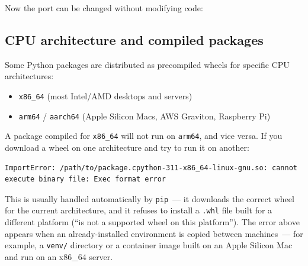 \noindent{}Now the port can be changed without modifying code:

\begin{codebox}[short]

\begin{Shaded}
\begin{Highlighting}[]
\OperatorTok{=}
\end{Highlighting}
\end{Shaded}

\end{codebox}

\subsection*{CPU architecture and compiled packages}\label{08-hidden-dependencies:cpu-architecture-and-compiled-packages}

Some Python packages are distributed as precompiled wheels for specific CPU architectures:

\begin{itemize}
\tightlist
\item
  \texttt{x86\_64} (most Intel/AMD desktops and servers)
\item
  \texttt{arm64} / \texttt{aarch64} (Apple Silicon Macs, AWS Graviton, Raspberry Pi)
\end{itemize}

\noindent{}A package compiled for \texttt{x86\_64} will not run on \texttt{arm64}, and vice versa. If you download a wheel on one architecture and try to run it on another:

\begin{outputbox}[short]
\begin{Verbatim}[fontsize=\codesize, breaklines, breakanywhere, breaksymbolleft={\tiny\textcolor{muted}{$\hookrightarrow$}}]
ImportError: /path/to/package.cpython-311-x86_64-linux-gnu.so: cannot execute binary file: Exec format error
\end{Verbatim}
\end{outputbox}

\noindent{}This is usually handled automatically by \texttt{pip}~--- it downloads the correct wheel for the current architecture, and it refuses to install a \texttt{.whl} file built for a different platform (``is not a supported wheel on this platform''). The error above appears when an already-installed environment is copied between machines~--- for example, a \texttt{venv/} directory or a container image built on an Apple Silicon Mac and run on an x86\_64 server.

